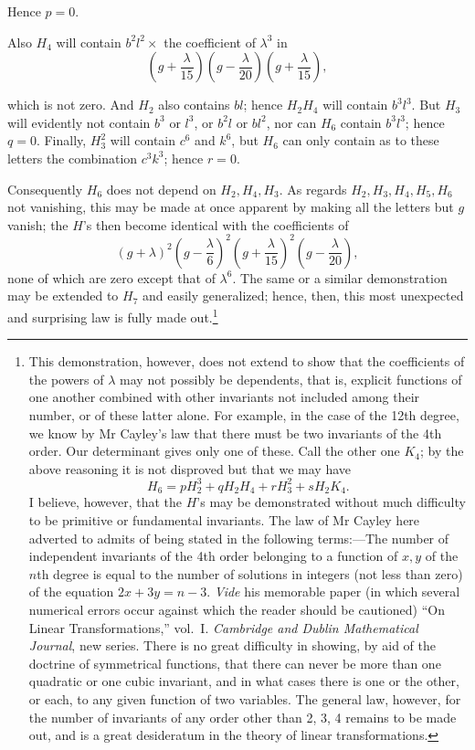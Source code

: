 \documentclass[11pt]{article}
\newcommand{\sourcepage}[1]{\marginpar{\scriptsize p.~#1}}
\begin{document}
Hence $p=0$.

Also $H_4$ will contain $b^2l^2\times$ the coefficient of $\lambda^3$ in
\[
\left(g+\frac{\lambda}{15}\right)\left(g-\frac{\lambda}{20}\right)\left(g+\frac{\lambda}{15}\right),
\]

\sourcepage{279}
which is not zero. And $H_2$ also contains $bl$; hence $H_2H_4$ will contain $b^3l^3$. But $H_3$ will evidently not contain $b^3$ or $l^3$, or $b^2l$ or $bl^2$, nor can $H_6$ contain $b^3l^3$; hence $q=0$. Finally, $H_3^2$ will contain $c^6$ and $k^6$, but $H_6$ can only contain as to these letters the combination $c^3k^3$; hence $r=0$.

Consequently $H_6$ does not depend on $H_2,H_4,H_3$. As regards $H_2,H_3,H_4,H_5,H_6$ not vanishing, this may be made at once apparent by making all the letters but $g$ vanish; the $H$'s then become identical with the coefficients of
\[
(g+\lambda)^2\left(g-\frac{\lambda}{6}\right)^2
\left(g+\frac{\lambda}{15}\right)^2\left(g-\frac{\lambda}{20}\right),
\]
none of which are zero except that of $\lambda^6$. The same or a similar demonstration may be extended to $H_7$ and easily generalized; hence, then, this most unexpected and surprising law is fully made out.\footnote{This demonstration, however, does not extend to show that the coefficients of the powers of $\lambda$ may not possibly be dependents, that is, explicit functions of one another combined with other invariants not included among their number, or of these latter alone. For example, in the case of the 12th degree, we know by Mr Cayley's law that there must be two invariants of the 4th order. Our determinant gives only one of these. Call the other one $K_4$; by the above reasoning it is not disproved but that we may have
\[
H_6=pH_2^3+qH_2H_4+rH_3^2+sH_2K_4.
\]
I believe, however, that the $H$'s may be demonstrated without much difficulty to be primitive or fundamental invariants. The law of Mr Cayley here adverted to admits of being stated in the following terms:---The number of independent invariants of the 4th order belonging to a function of $x,y$ of the $n$th degree is equal to the number of solutions in integers (not less than zero) of the equation $2x+3y=n-3$. \emph{Vide} his memorable paper (in which several numerical errors occur against which the reader should be cautioned) ``On Linear Transformations,'' vol.~I. \emph{Cambridge and Dublin Mathematical Journal}, new series. There is no great difficulty in showing, by aid of the doctrine of symmetrical functions, that there can never be more than one quadratic or one cubic invariant, and in what cases there is one or the other, or each, to any given function of two variables. The general law, however, for the number of invariants of any order other than 2, 3, 4 remains to be made out, and is a great desideratum in the theory of linear transformations.}
\end{document}

